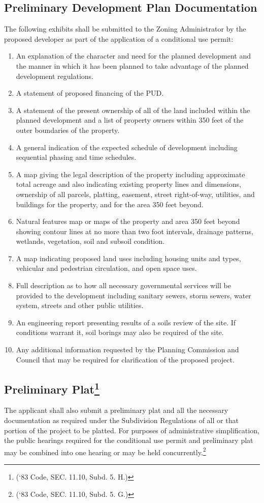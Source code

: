 \subsection{Preliminary Development Plan Documentation}
The following exhibits shall be submitted to the Zoning Administrator by the proposed developer as part of the application of a conditional use permit:
\begin{enumerate}[{\indent}1)]
    \item An explanation of the character and need for the planned development and the manner in which it has been planned to take advantage of the planned development regulations.
    \item A statement of proposed financing of the PUD.
    \item A statement of the present ownership of all of the land included within the planned development and a list of property owners within 350 feet of the outer boundaries of the property.
    \item A general indication of the expected schedule of development including sequential phasing and time schedules.
    \item A map giving the legal description of the property including approximate total acreage and also indicating existing property lines and dimensions, ownership of all parcels, platting, easement, street right-of-way, utilities, and buildings for the property, and for the area 350 feet beyond.
    \item Natural features map or maps of the property and area 350 feet beyond showing contour lines at no more than two foot intervals, drainage patterns, wetlands, vegetation, soil and subsoil condition.
    \item A map indicating proposed land uses including housing units and types, vehicular and pedestrian circulation, and open space uses.
    \item Full description as to how all necessary governmental services will be provided to the development including sanitary sewers, storm sewers, water system, streets and other public utilities.
    \item An engineering report presenting results of a soils review of the site.  If conditions warrant it, soil borings may also be required of the site.
    \item Any additional information requested by the Planning Commission and Council that may be required for clarification of the proposed project.
\end{enumerate}
\subsection{Preliminary Plat\footnote{(‘83 Code, SEC. 11.10, Subd. 5. H.)}}
The applicant shall also submit a preliminary plat and all the necessary documentation as required under the Subdivision Regulations of all or that portion of the project to be platted.  For purposes of administrative simplification, the public hearings required for the conditional use permit and preliminary plat may be combined into one hearing or may be held concurrently.\footnote{(‘83 Code, SEC. 11.10, Subd. 5. G.)}
